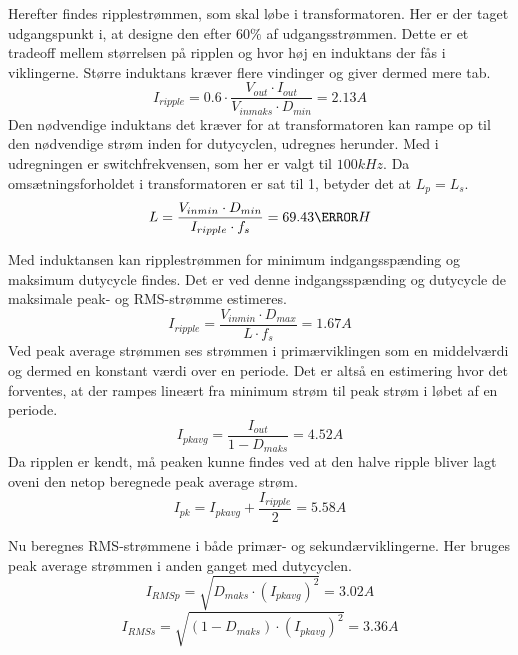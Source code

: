 Herefter findes ripplestrømmen, som skal løbe i transformatoren. Her er der taget udgangspunkt i, at designe den efter $60\percent$ af udgangsstrømmen\cite{flyback-formler}. Dette er et tradeoff mellem størrelsen på ripplen og hvor høj en induktans der fås i viklingerne. Større induktans kræver flere vindinger og giver dermed mere tab.
\begin{equation}
I_{ripple} = 0.6 \cdot \frac{V_{out} \cdot I_{out}}{V_{inmaks} \cdot   D_{min}} = 2.13A
\end{equation}
Den nødvendige induktans det kræver for at transformatoren kan rampe op til den nødvendige strøm inden for dutycyclen, udregnes herunder\cite{flyback-formler}. Med i udregningen er switchfrekvensen, som her er valgt til $100kHz$. Da omsætningsforholdet i transformatoren er sat til 1, betyder det at $L_p = L_s$.
\begin{equation}
L = \frac{V_{inmin} \cdot D_{min}}{I_{ripple} \cdot f_s} = 69.43\micro H
\end{equation}

\noindent Med induktansen kan ripplestrømmen for minimum indgangsspænding og maksimum dutycycle findes. Det er ved denne indgangsspænding og dutycycle de maksimale peak- og RMS-strømme estimeres. 
\begin{equation} \label{I_ripple_CCM}
I_{ripple} = \frac{V_{inmin} \cdot D_{max}}{L \cdot f_s} = 1.67A
\end{equation}
Ved peak average strømmen ses strømmen i primærviklingen som en middelværdi og dermed en konstant værdi over en periode. Det er altså en estimering hvor det forventes, at der rampes lineært fra minimum strøm til peak strøm i løbet af en periode. 
\begin{equation} \label{I_pk_avg_CCM}
I_{pkavg} = \frac{I_{out}}{1-D_{maks}} = 4.52A
\end{equation}
Da ripplen er kendt, må peaken kunne findes ved at den halve ripple bliver lagt oveni den netop beregnede peak average strøm.
\begin{equation} \label{I_pk_CCM}
I_{pk} = I_{pkavg} + \frac{I_{ripple}}{2} = 5.58A
\end{equation}

\noindent Nu beregnes RMS-strømmene i både primær- og sekundærviklingerne. Her bruges peak average strømmen i anden ganget med dutycyclen\cite{transformator-design}. 
\begin{equation} \label{I_p_RMS_CCM}
I_{RMSp} = \sqrt{D_{maks} \cdot (I_{pkavg})^2} = 3.02A
\end{equation}
\begin{equation} \label{I_s_RMS_CCM}
I_{RMSs} = \sqrt{(1-D_{maks}) \cdot (I_{pkavg})^2} = 3.36A
\end{equation}

